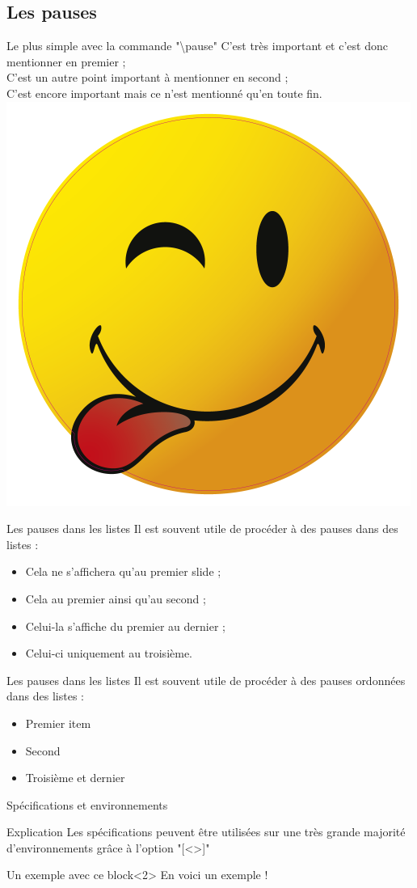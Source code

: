 \documentclass[8pt]{beamer}
\begin{document}
\subsection{Les pauses}
	\begin{frame}{Le plus simple avec la commande "\textbackslash pause"}\centering
		C'est très important et c'est donc mentionner en premier ;\\\vfill \pause
		C'est un autre point important à mentionner en second ;\\\vfill \pause
		C'est encore important mais ce n'est mentionné qu'en toute fin.\\\vfill \pause
		\includegraphics[width=.15\textwidth]{smiley.png}
	\end{frame}
	\begin{frame}{Les pauses dans les listes}\centering
		Il est souvent utile de procéder à des pauses dans des listes :
		\begin{itemize}
			\item<1> Cela ne s'affichera qu'au premier slide ;
			\item<1-2> Cela au premier ainsi qu'au second ;
			\item<1-> Celui-la s'affiche du premier au dernier ;
			\item<3> Celui-ci uniquement au troisième.
		\end{itemize}
	\end{frame}
	\begin{frame}{Les pauses dans les listes}\centering
		Il est souvent utile de procéder à des pauses ordonnées dans des listes :
		\begin{itemize}[<+->]
			\item Premier item
			\item Second
			\item Troisième et dernier
		\end{itemize}
	\end{frame}
	\begin{frame}{Spécifications et environnements}\centering
		\begin{block}{Explication}
			Les spécifications peuvent être utilisées sur une très grande majorité d'environnements grâce à l'option "[<>]"
		\end{block}
		\begin{exampleblock}{Un exemple avec ce block}<2>
			En voici un exemple !
		\end{exampleblock}
	\end{frame}
\end{document}
